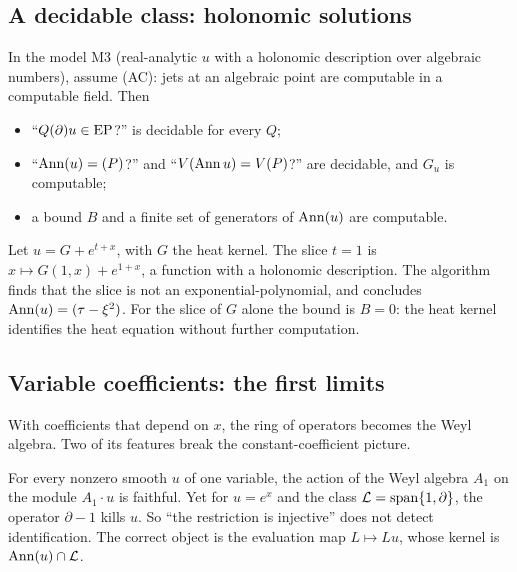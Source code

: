 \subsection{A decidable class: holonomic solutions}

\begin{theorem}\label{thm:holo}
In the model M3 (real-analytic $u$ with a holonomic description over algebraic numbers), assume (AC): jets at an algebraic point are computable in a computable field. Then
\begin{itemize}
\item ``$Q(\partial)u\in\mathrm{EP}$?'' is decidable for every $Q$;
\item ``$\operatorname{Ann}(u)=(P)$?'' and ``$V(\operatorname{Ann} u)=V(P)$?'' are decidable, and $G_u$ is computable;
\item a bound $B$ and a finite set of generators of $\operatorname{Ann}(u)$ are computable.
\end{itemize}
\end{theorem}

\begin{example}
Let $u=G+e^{t+x}$, with $G$ the heat kernel. The slice $t=1$ is $x\mapsto G(1,x)+e^{1+x}$, a function with a holonomic description. The algorithm finds that the slice is not an exponential-polynomial, and concludes $\operatorname{Ann}(u)=(\tau-\xi^2)$. For the slice of $G$ alone the bound is $B=0$: the heat kernel identifies the heat equation without further computation.
\end{example}

\subsection{Variable coefficients: the first limits}

With coefficients that depend on $x$, the ring of operators becomes the Weyl algebra. Two of its features break the constant-coefficient picture.

\begin{proposition}\label{prop:weyl}
For every nonzero smooth $u$ of one variable, the action of the Weyl algebra $A_1$ on the module $A_1\cdot u$ is faithful. Yet for $u=e^x$ and the class $\mathcal L=\operatorname{span}\{1,\partial\}$, the operator $\partial-1$ kills $u$. So ``the restriction is injective'' does not detect identification. The correct object is the evaluation map $L\mapsto Lu$, whose kernel is $\operatorname{Ann}(u)\cap\mathcal L$.

\end{proposition}

